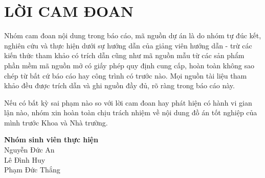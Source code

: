 \clearpage
\section*{LỜI CAM ĐOAN}

Nhóm cam đoan nội dung trong báo cáo, mã nguồn dự án là do nhóm tự đúc kết, nghiên cứu và thực hiện dưới sự hướng dẫn của giảng viên hướng dẫn - trừ các kiến thức tham khảo có trích dẫn cũng như
mã nguồn mẫu từ các sản phẩm phần mềm mã nguồn mở có giấy phép quy định cung cấp, hoàn toàn không sao chép từ bất cứ báo cáo hay công trình có trước nào. Mọi nguồn tài liệu tham khảo
đều được trích dẫn và ghi nguồn đầy đủ, rõ ràng trong báo cáo này. 
\vspace{0.5cm}

Nếu có bất kỳ sai phạm nào so với lời cam đoan hay phát hiện có hành vi gian lận nào, nhóm xin hoàn toàn chịu trách nhiệm về nội dung đồ án tốt nghiệp của mình trước Khoa và Nhà trường.

\vspace{1cm}

\hfill %
\begin{minipage}{0.4\textwidth}
\centering %
    \textbf{Nhóm sinh viên thực hiện} \\[0.5cm]
    Nguyễn Đức An \\[0.2cm]
    Lê Đình Huy \\[0.2cm]
    Phạm Đức Thắng
\end{minipage}

\clearpage

